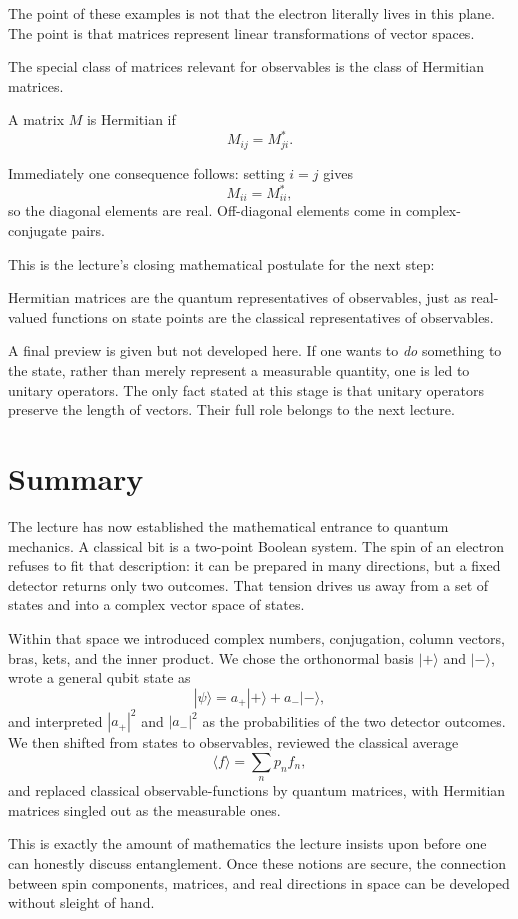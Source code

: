 The point of these examples is not that the electron literally lives in this plane. The point is that matrices represent linear transformations of vector spaces.

The special class of matrices relevant for observables is the class of Hermitian matrices.

\begin{definition}
A matrix \(M\) is Hermitian if
\begin{equation}
M_{ij}=M_{ji}^*.
\end{equation}
\end{definition}

Immediately one consequence follows: setting \(i=j\) gives
\[
M_{ii}=M_{ii}^*,
\]
so the diagonal elements are real. Off-diagonal elements come in complex-conjugate pairs.

This is the lecture's closing mathematical postulate for the next step:
\begin{remark}
Hermitian matrices are the quantum representatives of observables, just as real-valued functions on state points are the classical representatives of observables.
\end{remark}

A final preview is given but not developed here. If one wants to \emph{do} something to the state, rather than merely represent a measurable quantity, one is led to unitary operators. The only fact stated at this stage is that unitary operators preserve the length of vectors. Their full role belongs to the next lecture.

\section{Summary}

The lecture has now established the mathematical entrance to quantum mechanics. A classical bit is a two-point Boolean system. The spin of an electron refuses to fit that description: it can be prepared in many directions, but a fixed detector returns only two outcomes. That tension drives us away from a set of states and into a complex vector space of states.

Within that space we introduced complex numbers, conjugation, column vectors, bras, kets, and the inner product. We chose the orthonormal basis \(|+\rangle\) and \(|-\rangle\), wrote a general qubit state as
\[
|\psi\rangle=a_+|+\rangle+a_-|-\rangle,
\]
and interpreted \(|a_+|^2\) and \(|a_-|^2\) as the probabilities of the two detector outcomes. We then shifted from states to observables, reviewed the classical average
\[
\langle f\rangle=\sum_n p_n f_n,
\]
and replaced classical observable-functions by quantum matrices, with Hermitian matrices singled out as the measurable ones.

This is exactly the amount of mathematics the lecture insists upon before one can honestly discuss entanglement. Once these notions are secure, the connection between spin components, matrices, and real directions in space can be developed without sleight of hand.